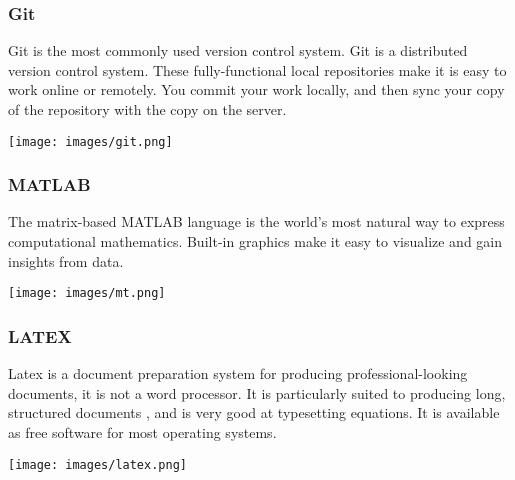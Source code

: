 \documentclass{beamer}
\begin{document}
\begin{frame}
\frametitle{Git}
Git is the most commonly used version control system. Git is a distributed version control system. These fully-functional local repositories make it is easy to work online or remotely. You commit your work locally, and then sync your copy of the repository with the copy on the server.

\begin{center}
 \texttt{[image: images/git.png]}
\end{center}


\end{frame}

\begin{frame}
\frametitle{MATLAB}

The matrix-based MATLAB language is the world's most natural way to express computational mathematics. Built-in graphics make it easy to visualize and gain insights from data.

\begin{center}
 \texttt{[image: images/mt.png]}
\end{center}

\end{frame}

\begin{frame}
\frametitle{LATEX}

Latex is a document preparation system for producing professional-looking documents, it is not a word processor. It is particularly suited to producing long, structured documents , and is very good at typesetting equations. It is available as free software for most operating systems.


\begin{center}
 \texttt{[image: images/latex.png]}
\end{center}

\end{frame}
\end{document}
